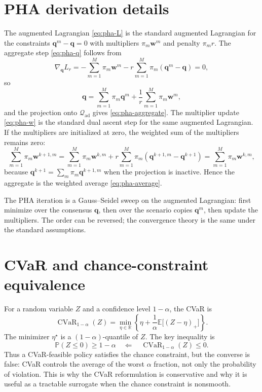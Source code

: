 \documentclass[11pt]{article}
\numberwithin{equation}{section}
\newcommand{\R}{\mathbb{R}}
\newcommand{\E}{\mathbb{E}}
\newcommand{\Prob}{\mathbb{P}}
\newcommand{\qq}{\mathbf{q}}
\newcommand{\ww}{\mathbf{w}}
\newcommand{\CVaR}{\operatorname{CVaR}}
\theoremstyle{plain}
\begin{document}
\appendix

\section{PHA derivation details}
\label{app:pha}

The augmented Lagrangian \eqref{eq:pha-L} is the standard augmented Lagrangian
for the constraints $\qq^m-\qq=0$ with multipliers $\pi_m\ww^m$ and penalty
$\pi_m r$.  The aggregate step \eqref{eq:pha-q} follows from
\begin{equation}
\label{eq:pha-deriv}
\nabla_{\qq}L_r
=-\sum_{m=1}^{M}\pi_m\ww^m
-r\sum_{m=1}^{M}\pi_m(\qq^m-\qq)=0,
\end{equation}
so
\begin{equation}
\label{eq:pha-deriv2}
\qq=\sum_{m=1}^{M}\pi_m\qq^m
+\frac{1}{r}\sum_{m=1}^{M}\pi_m\ww^m,
\end{equation}
and the projection onto $\mathcal{Q}_{\mathrm{ad}}$ gives
\eqref{eq:pha-aggregate}.  The multiplier update \eqref{eq:pha-w} is the
standard dual ascent step for the same augmented Lagrangian.  If the
multipliers are initialized at zero, the weighted sum of the multipliers
remains zero:
\begin{equation}
\label{eq:pha-mult-sum}
\sum_{m=1}^{M}\pi_m\ww^{k+1,m}
=\sum_{m=1}^{M}\pi_m\ww^{k,m}
+r\sum_{m=1}^{M}\pi_m(\qq^{k+1,m}-\qq^{k+1})
=\sum_{m=1}^{M}\pi_m\ww^{k,m},
\end{equation}
because $\qq^{k+1}=\sum_m\pi_m\qq^{k+1,m}$ when the projection is inactive.
Hence the aggregate is the weighted average \eqref{eq:pha-average}.

The PHA iteration is a Gauss--Seidel sweep on the augmented Lagrangian: first
minimize over the consensus $\qq$, then over the scenario copies $\qq^m$, then
update the multipliers.  The order can be reversed; the convergence theory is
the same under the standard assumptions.

\section{CVaR and chance-constraint equivalence}
\label{app:cvar}

For a random variable $Z$ and a confidence level $1-\alpha$, the CVaR is
\begin{equation}
\label{eq:app-cvar}
\CVaR_{1-\alpha}(Z)
=\min_{\eta\in\R}\left\{
\eta+\frac{1}{\alpha}\E\bigl[(Z-\eta)_+\bigr]
\right\}.
\end{equation}
The minimizer $\eta^\star$ is a $(1-\alpha)$-quantile of $Z$.  The key
inequality is
\begin{equation}
\label{eq:app-cvar-ineq}
\Prob(Z\le0)\ge1-\alpha
\quad\Longleftarrow\quad
\CVaR_{1-\alpha}(Z)\le0.
\end{equation}
Thus a CVaR-feasible policy satisfies the chance constraint, but the converse
is false: CVaR controls the average of the worst $\alpha$ fraction, not only
the probability of violation.  This is why the CVaR reformulation is
conservative and why it is useful as a tractable surrogate when the chance
constraint is nonsmooth.
\end{document}
